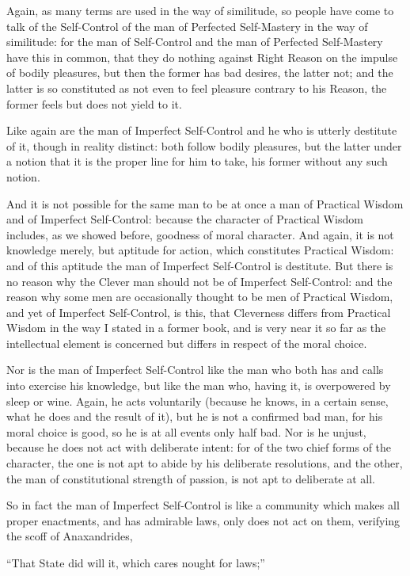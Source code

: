 Again, as many terms are used in the way of similitude, so people have come to
talk of the Self-Control of the man of Perfected Self-Mastery in the way of
similitude: for the man of Self-Control and the man of Perfected Self-Mastery
have this in common, that they do nothing against Right Reason on the impulse
of bodily pleasures, but then the former has bad desires, the latter not; and
the latter is so constituted as not even to feel pleasure contrary to his
Reason, the former feels but does not yield to it.

Like again are the man of Imperfect Self-Control and he who is utterly
destitute of it, though in reality distinct: both follow bodily pleasures, but
the latter under a notion that it is the proper line for him to take, his
former without any such notion.

And it is not possible for the same man to be at once a man of Practical Wisdom
and of Imperfect Self-Control: because the character of Practical Wisdom
includes, as we showed before, goodness of moral character. And again, it is
not knowledge merely, but aptitude for action, which constitutes Practical
Wisdom: and of this aptitude the man of Imperfect Self-Control is destitute.
But there is no reason why the Clever man should not be of Imperfect
Self-Control: and the reason why some men are occasionally thought to be men of
Practical Wisdom, and yet of Imperfect Self-Control, is this, that Cleverness
differs from Practical Wisdom in the way I stated in a former book, and is very
near it so far as the intellectual element is concerned but differs in respect
of the moral choice.

Nor is the man of Imperfect Self-Control like the man who both has and calls
into exercise his knowledge, but like the man who, having it, is overpowered by
sleep or wine. Again, he acts voluntarily (because he knows, in a certain
sense, what he does and the result of it), but he is not a confirmed bad man,
for his moral choice is good, so he is at all events only half bad. Nor is he
unjust, because he does not act with deliberate intent: for of the two chief
forms of the character, the one is not apt to abide by his deliberate
resolutions, and the other, the man of constitutional strength of passion, is
not apt to deliberate at all.

So in fact the man of Imperfect Self-Control is like a community which makes
all proper enactments, and has admirable laws, only does not act on them,
verifying the scoff of Anaxandrides,

“That State did will it, which cares nought for laws;”

